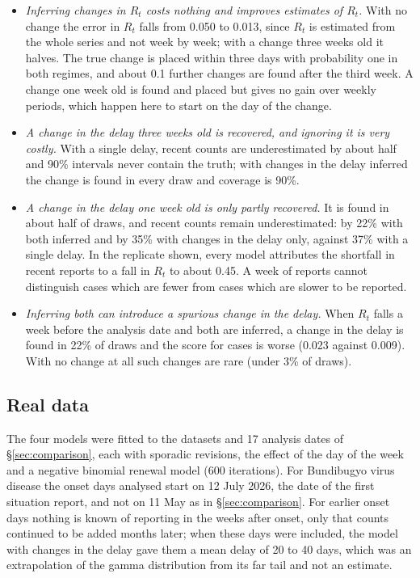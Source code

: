 \documentclass[11pt,a4paper]{article}
\begin{document}
\begin{itemize}[itemsep=2pt]
\item \emph{Inferring changes in $R_t$ costs nothing and improves estimates of
$R_t$.} With no change the error in $R_t$ falls from 0.050 to 0.013, since
$R_t$ is estimated from the whole series and not week by week; with a change
three weeks old it halves. The true change is placed within three days with
probability one in both regimes, and about 0.1 further changes are found
after the third week. A change one week old is found and placed but gives no
gain over weekly periods, which happen here to start on the day of the change.
\item \emph{A change in the delay three weeks old is recovered, and ignoring it
is very costly.} With a single delay, recent counts are underestimated by
about half and 90\% intervals never contain the truth; with changes in the
delay inferred the change is found in every draw and coverage is 90\%.
\item \emph{A change in the delay one week old is only partly recovered.} It
is found in about half of draws, and recent counts remain underestimated: by
22\% with both inferred and by 35\% with changes in the delay only, against
37\% with a single delay. In the replicate shown, every model attributes
the shortfall in recent reports to a fall in $R_t$ to about 0.45. A week of
reports cannot distinguish cases which are fewer from cases which are slower
to be reported.
\item \emph{Inferring both can introduce a spurious change in the delay.} When
$R_t$ falls a week before the analysis date and both are inferred, a change in
the delay is found in 22\% of draws and the score for cases is worse (0.023
against 0.009). With no change at all such changes are rare (under 3\% of
draws).
\end{itemize}

\subsection{Real data}\label{sec:changepointreal}

The four models were fitted to the datasets and 17 analysis dates of
\S\ref{sec:comparison}, each with sporadic revisions, the effect of the day of
the week and a negative binomial renewal model (600 iterations). For
Bundibugyo virus disease the onset days analysed start on 12 July 2026, the
date of the first situation report, and not on 11 May as in
\S\ref{sec:comparison}. For earlier onset days nothing is known of reporting
in the weeks after onset, only that counts continued to be added months later;
when these days were included, the model with changes in the delay gave them
a mean delay of 20 to 40 days, which was an extrapolation of the gamma
distribution from its far tail and not an estimate.
\end{document}
